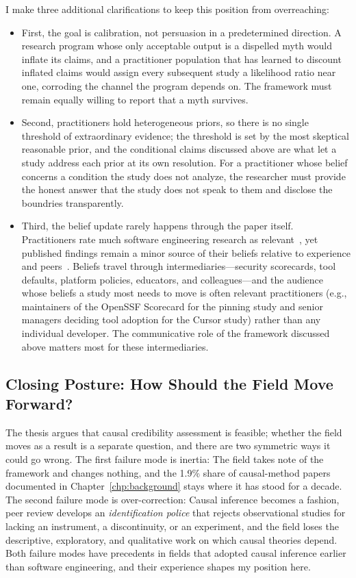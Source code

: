 I make three additional clarifications to keep this position from overreaching:
\begin{itemize}
  \item First, the goal is calibration, not persuasion in a predetermined direction.
A research program whose only acceptable output is a dispelled myth would inflate its claims, and a practitioner population that has learned to discount inflated claims would assign every subsequent study a likelihood ratio near one, corroding the channel the program depends on.
The framework must remain equally willing to report that a myth survives.
  \item Second, practitioners hold heterogeneous priors, so there is no single threshold of extraordinary evidence; the threshold is set by the most skeptical reasonable prior, and the conditional claims discussed above are what let a study address each prior at its own resolution.
For a practitioner whose belief concerns a condition the study does not analyze, the researcher must provide the honest answer that the study does not speak to them and disclose the boundries transparently.
  \item Third, the belief update rarely happens through the paper itself.
Practitioners rate much software engineering research as relevant~\cite{DBLP:conf/sigsoft/LoNZ15}, yet published findings remain a minor source of their beliefs relative to experience and peers~\cite{DBLP:conf/icse/Devanbu0B16, DBLP:journals/ese/GarousiBO20}.
Beliefs travel through intermediaries---security scorecards, tool defaults, platform policies, educators, and colleagues---and the audience whose beliefs a study most needs to move is often relevant practitioners (e.g., maintainers of the OpenSSF Scorecard for the pinning study and senior managers deciding tool adoption for the Cursor study) rather than any individual developer.
The communicative role of the framework discussed above matters most for these intermediaries.
\end{itemize}

\subsection{Closing Posture: How Should the Field Move Forward?}
\label{sec:conclusion-closing}

The thesis argues that causal credibility assessment is feasible; whether the field moves as a result is a separate question, and there are two symmetric ways it could go wrong.
The first failure mode is inertia: The field takes note of the framework and changes nothing, and the 1.9\% share of causal-method papers documented in Chapter~\ref{chp:background} stays where it has stood for a decade.
The second failure mode is over-correction: Causal inference becomes a fashion, peer review develops an \emph{identification police} that rejects observational studies for lacking an instrument, a discontinuity, or an experiment, and the field loses the descriptive, exploratory, and qualitative work on which causal theories depend.
Both failure modes have precedents in fields that adopted causal inference earlier than software engineering, and their experience shapes my position here.

